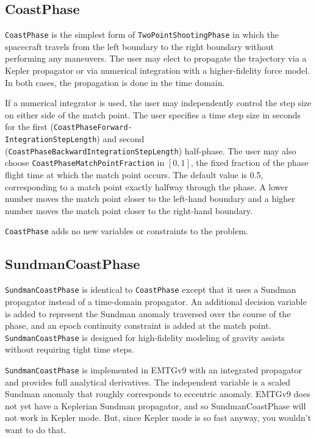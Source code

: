 \subsection{CoastPhase}
\label{subsec:CoastPhase}

\texttt{CoastPhase} is the simplest form of \texttt{TwoPointShootingPhase} in which the spacecraft travels from the left boundary to the right boundary without performing any maneuvers. The user may elect to propagate the trajectory via a Kepler propagator or via numerical integration with a higher-fidelity force model. In both cases, the propagation is done in the time domain.

If a numerical integrator is used, the user may independently control the step size on either side of the match point. The user specifies a time step size in seconds for the first (\texttt{CoastPhaseForward-\\IntegrationStepLength}) and second (\texttt{CoastPhaseBackwardIntegrationStepLength}) half-phase. The user may also choose \texttt{CoastPhaseMatchPointFraction} in $\left[0, 1\right]$, the fixed fraction of the phase flight time at which the match point occurs. The default value is 0.5, corresponding to a match point exactly halfway through the phase. A lower number moves the match point closer to the left-hand boundary and a higher number moves the match point closer to the right-hand boundary.

\texttt{CoastPhase} adds no new variables or constraints to the problem.

\subsection{SundmanCoastPhase}
\label{subsec:sundmancoastphase}

\texttt{SundmanCoastPhase} is identical to \texttt{CoastPhase} except that it uses a Sundman propagator instead of a time-domain propagator. An additional decision variable is added to represent the Sundman anomaly traversed over the course of the phase, and an epoch continuity constraint is added at the match point. \texttt{SundmanCoastPhase} is designed for high-fidelity modeling of gravity assists without requiring tight time steps.

\texttt{SundmanCoastPhase} is implemented in EMTGv9 with an integrated propagator and provides full analytical derivatives. The independent variable is a scaled Sundman anomaly that roughly corresponds to eccentric anomaly. EMTGv9 does not yet have a Keplerian Sundman propagator, and so SundmanCoastPhase will not work in Kepler mode. But, since Kepler mode is so fast anyway, you wouldn't want to do that.

